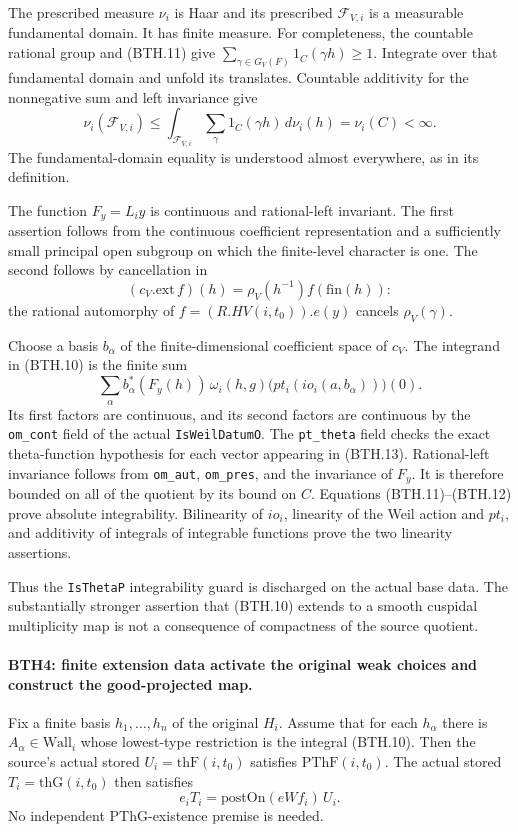 The prescribed measure \(\nu_i\) is Haar and its prescribed
\(\mathcal F_{V,i}\) is a measurable fundamental domain.  It
has finite measure.  For completeness, the countable rational
group and (BTH.11) give
\(\sum_{\gamma\in G_V(F)}1_C(\gamma h)\ge1\).
Integrate over that fundamental domain and unfold its
translates.  Countable additivity for the nonnegative sum and
left invariance give
\[
 \nu_i(\mathcal F_{V,i})
 \le\int_{\mathcal F_{V,i}}\sum_\gamma1_C(\gamma h)\,d\nu_i(h)
 =\nu_i(C)<\infty.                                               \tag{BTH.12}
\]
The fundamental-domain equality is understood almost everywhere,
as in its definition.

The function \(F_y=L_i y\) is continuous and rational-left
invariant.  The first assertion follows from the continuous
coefficient representation and a sufficiently small principal
open subgroup on which the finite-level character is one.
The second follows by cancellation in
\[
     (c_V.\mathrm{ext}\,f)(h)
       =\rho_V(h^{-1})f(\mathrm{fin}(h)):
\]
the rational automorphy of \(f=(R.HV(i,t_0)).e(y)\) cancels
\(\rho_V(\gamma)\).

Choose a basis \(b_\alpha\) of the finite-dimensional
coefficient space of \(c_V\).  The integrand in (BTH.10) is
the finite sum
\[
 \sum_\alpha b_\alpha^*(F_y(h))\,
    \omega_i(h,g)\bigl(pt_i(io_i(a,b_\alpha))\bigr)(0).            \tag{BTH.13}
\]
Its first factors are continuous, and its second factors
are continuous by the \texttt{om\_\allowbreak cont} field of the actual
\texttt{Is\allowbreak Weil\allowbreak Datum\allowbreak O}.  The \texttt{pt\_\allowbreak theta} field checks
the exact theta-function hypothesis for each vector appearing
in (BTH.13).  Rational-left invariance follows from
\texttt{om\_\allowbreak aut}, \texttt{om\_\allowbreak pres}, and the invariance of
\(F_y\).  It is therefore bounded on all of the quotient by
its bound on \(C\).  Equations (BTH.11)--(BTH.12) prove absolute
integrability.  Bilinearity of \(io_i\), linearity of the
Weil action and \(pt_i\), and additivity of integrals of
integrable functions prove the two linearity assertions.

Thus the \texttt{Is\allowbreak Theta\allowbreak P} integrability guard is discharged
on the actual base data.  The substantially stronger assertion
that (BTH.10) extends to a smooth cuspidal multiplicity map is
not a consequence of compactness of the source quotient.

\paragraph{BTH4: finite extension data activate the original weak choices and construct the good-projected map.}
\label{claim:BTH4}
Fix a finite basis \(h_1,\ldots,h_n\) of the original \(H_i\).
Assume that for each \(h_\alpha\) there is
\(A_\alpha\in\mathrm{Wall}_i\) whose lowest-type restriction
is the integral (BTH.10).  Then the source's actual stored
\(U_i=\mathrm{thF}(i,t_0)\) satisfies \(\mathrm{PThF}(i,t_0)\).
The actual stored \(T_i=\mathrm{thG}(i,t_0)\) then satisfies
\[
       e_i T_i=\mathrm{postOn}(eWf_i)\,U_i.                      \tag{BTH.14}
\]
No independent \(\mathrm{PThG}\)-existence premise is needed.

